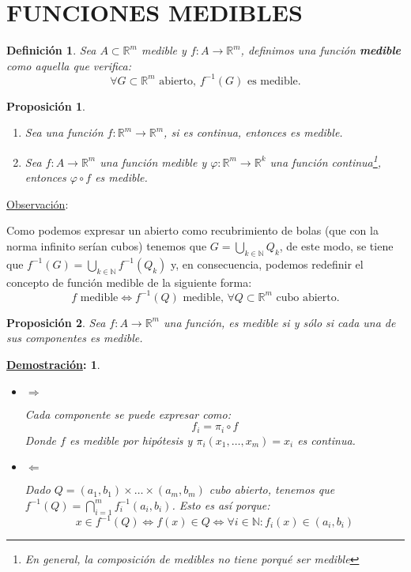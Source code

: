 \documentclass[10pt,a4paper,openright]{book}
\theoremstyle{break}
\newtheorem*{defi}{Definición}
\newtheorem*{prop}{Proposición}
\newtheorem*{demo}{\underline{Demostración}:}
\begin{document}
\section*{FUNCIONES MEDIBLES}%
\label{sec:funciones_medibles}


\begin{defi}
Sea $A \subset \mathbb{R}^m$ medible y $f: A \rightarrow \mathbb{R}^m$, definimos una función \textbf{medible} como aquella que verifica:
$$\forall G \subset \mathbb{R}^m \text{ abierto, } f^{-1}(G) \text{ es medible}.$$ 
\end{defi}

\begin{prop}
\begin{enumerate}
\item Sea una función $f: \mathbb{R}^m \rightarrow \mathbb{R}^m$, si es continua, entonces es medible.

\item Sea $f: A \rightarrow \mathbb{R}^m$ una función medible y $\varphi: \mathbb{R}^m \rightarrow \mathbb{R}^k$ una función continua\footnote{En general, la composición de medibles no tiene porqué ser medible}, entonces $\varphi \circ f$ es medible.
\end{enumerate}
\end{prop}

\underline{Observación}:

Como podemos expresar un abierto como recubrimiento de bolas (que con la norma infinito serían cubos) tenemos que $G = \bigcup_{k \in \mathbb{N}} Q_k$, de este modo, se tiene que $f^{-1}\left( G \right) = \bigcup_{k \in \mathbb{N}}f^{-1}\left( Q_k \right)$ y, en consecuencia, podemos redefinir el concepto de función medible de la siguiente forma:
$$f \text{ medible} \Leftrightarrow f^{-1}\left( Q \right) \text{ medible, } \forall Q \subset \mathbb{R}^m \text{ cubo abierto.}$$


\begin{prop}
Sea $f: A \rightarrow \mathbb{R}^m$ una función, es medible si y sólo si cada una de sus componentes es medible.
\end{prop}
\begin{demo}
\begin{itemize}
\item $\Rightarrow$

Cada componente se puede expresar como:
$$f_i = \pi_i \circ f$$
Donde $f$ es medible por hipótesis y $\pi_i\left( x_1, \ldots, x_m \right) = x_i$ es continua.

\item $\Leftarrow$

Dado $Q = \left( a_1, b_1 \right) \times \ldots \times \left( a_m, b_m \right)$ cubo abierto, tenemos que $f^{-1}\left( Q \right) = \bigcap_{i = 1}^{m} f_i^{-1}\left( a_i, b_i \right)$. Esto es así porque:
$$x \in f^{-1}\left( Q \right) \Leftrightarrow f\left( x \right) \in Q \Leftrightarrow \forall i \in \mathbb{N} : f_i\left( x \right) \in \left( a_i, b_i \right)$$
\end{itemize}
\end{demo}
\end{document}
